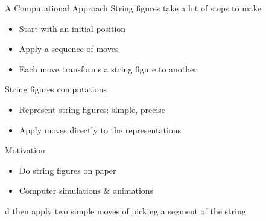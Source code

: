 \begin{frame}{A Computational Approach}
String figures take a lot of steps to make

\begin{itemize}[<+(1)->]
    \item  Start with an initial position
    \item  Apply a sequence of moves
    \item  Each move transforms a string figure to another
\end{itemize}

\pause String figures computations

\begin{itemize}[<+(1)->]
    \item  Represent string figures: simple, precise
    \item  Apply moves directly to the representations
\end{itemize}

\pause Motivation

\begin{itemize}[<+(1)->]
    \item Do string figures on paper
    \item Computer simulations \& animations
\end{itemize}

d then apply two simple moves of picking a segment of the string 

\end{frame}
